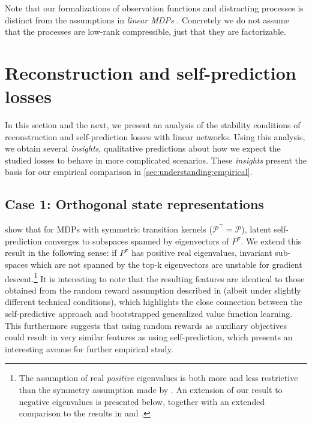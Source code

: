 Note that our formalizations of observation functions and distracting processes is distinct from the assumptions in \emph{linear MDPs} \parencite{jin2020provably}. Concretely we do not assume that the processes are low-rank compressible, just that they are factorizable.

\section{Reconstruction and self-prediction losses}
\label{sec:understanding:stand_alone_tasks}

In this section and the next, we present an analysis of the stability conditions of reconstruction and self-prediction losses with linear networks.
Using this analysis, we obtain several \emph{insights}, qualitative predictions about how we expect the studied losses to behave in more complicated scenarios.
These \emph{insights} present the basis for our empirical comparison in \autoref{sec:understanding:empirical}.

\subsection{Case 1: Orthogonal state representations}


\textcite{tang2022understanding} show that for MDPs with symmetric transition kernels ($\mathcal{P}^\top = \mathcal{P}$), latent self-prediction converges to subspaces spanned by eigenvectors of $P^\pi$. 
We extend this result in the following sense: if $P^\pi$ has positive real eigenvalues, invariant sub-spaces which are not spanned by the top-k eigenvectors are unstable for gradient descent.\footnote{The assumption of real \emph{positive} eigenvalues is both more and less restrictive than the symmetry assumption made by \textcite{tang2022understanding}. An extension of our result to negative eigenvalues is presented below, together with an extended comparison to the results in \textcite{tang2022understanding} and \textcite{lelan2023bootstrapped}.}
It is interesting to note that the resulting features are identical to those obtained from the random reward assumption described in \textcite{lelan2023bootstrapped} (albeit under slightly different technical conditions), which highlights the close connection between the self-predictive approach and bootstrapped generalized value function learning.
This furthermore suggests that using random rewards as auxiliary objectives \parencite{farebrother2023protovalue} could result in very similar features as using self-prediction, which presents an interesting avenue for further empirical study.

